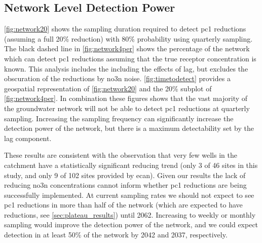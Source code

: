 \subsection[Network Detection Power]{Network Level Detection Power} \label{sec:network_results}

\autoref{fig:network20} shows the sampling duration required to detect \gls{pc1} reductions (assuming a full 20\% reduction) with 80\% probability using quarterly sampling. The black dashed line in \autoref{fig:network4per} shows the percentage of the network which can detect \gls{pc1} reductions assuming that the true receptor concentration is known. This analysis includes the including the effects of lag, but excludes the obscuration of the reductions by \gls{no3n} noise.
\autoref{fig:timetodetect} provides a geospatial representation of \autoref{fig:network20} and the 20\% subplot of \autoref{fig:network4per}. In combination these figures shows that the vast majority of the groundwater network will not be able to detect \gls{pc1} reductions at quarterly sampling. Increasing the sampling frequency can significantly increase the detection power of the network, but there is a maximum detectability set by the lag component.

These results are consistent with the observation that very few wells in the catchment have a statistically significant reducing trend (only 3 of 46 sites in this study, and only 9 of 102 sites provided by \gls{ecan}). Given our results the lack of reducing \gls{no3n} concentrations cannot inform whether \gls{pc1} reductions are being successfully implemented. At current sampling rates we should not expect to see \gls{pc1} reductions in more than half of the network (which are expected to have reductions, see \autoref{sec:plateau_results}) until 2062. Increasing to weekly or monthly sampling would improve the detection power of the network, and we could expect detection in at least 50\% of the network by 2042 and 2037, respectively.


\begin{landscape}




\end{landscape}

